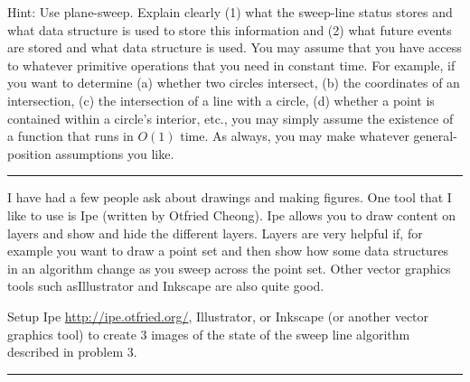 \documentclass[11pt]{article}
\begin{document}
Hint: Use plane-sweep. Explain clearly (1) what the sweep-line status stores and
what data structure is used to store this information and (2) what future events
are stored and what data structure is used. You may assume that you have access
to whatever primitive operations that you need in constant time. For example, if
you want to determine (a) whether two circles intersect, (b) the coordinates of
an intersection, (c) the intersection of a line with a circle, (d) whether a
point is contained within a circle's interior, etc., you may simply assume the
existence of a function that runs in $O(1)$ time. As always, you may make
whatever general-position assumptions you like.

\hrule









I have had a few people ask about drawings and making figures.  One tool that I
like to use is Ipe (written by Otfried Cheong).  Ipe allows you to draw content
on layers and show and hide the different layers.  Layers are very helpful if,
for example you want to draw a point set and then show how some data structures
in an algorithm change as you sweep across the point set.
Other vector graphics tools such asIllustrator and Inkscape are also quite good.

Setup Ipe \url{http://ipe.otfried.org/}, Illustrator, or Inkscape
(or another vector graphics tool)
to create 3 images of the state of the sweep line algorithm
described in problem 3.

\hrule
\end{document}

